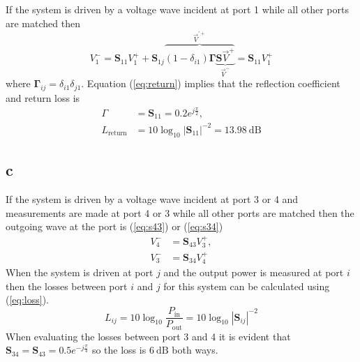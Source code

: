 \documentclass{article}
\begin{document}
If the system is driven by a voltage wave incident at port 1 while all other ports are matched then
\begin{equation}
  V^{-}_{1}=\mathbf{S}_{11}V^{+}_{1} + \mathbf{S}_{1j}\overbrace{(1-\delta_{i1})\mathbf{\Gamma}\underbrace{\mathbf{S}\vec{V}^{+}}_{\vec{V}^{-}}}^{\vec{V}^{'+}}=\mathbf{S}_{11}V^{+}_{1}
  \label{eq:return}
\end{equation}
where $\mathbf{\Gamma}_{ij}=\delta_{i1}\delta_{j1}$. Equation (\ref{eq:return}) implies that the reflection coefficient and return loss is
\begin{subequations}
  \begin{align}
    \Gamma & = \mathbf{S}_{11}=0.2e^{j\frac{\pi}{2}}, \\
    L_\text{return} & = 10\log_{10}|\mathbf{S}_{11}|^{-2}=\SI{13.98}{\deci\bel}
  \end{align}
  \label{eq:RL}
\end{subequations}

\subsection{c}\label{sec:1c}
If the system is driven by a voltage wave incident at port 3 or 4 and measurements are made at port 4 or 3 while all other ports are matched then the outgoing wave at the port is (\ref{eq:s43}) or (\ref{eq:s34})
\begin{subequations}
  \begin{align}
    V^{-}_{4} & =\mathbf{S}_{43}V^{+}_{3}, \label{eq:s43} \\
    V^{-}_{3} & =\mathbf{S}_{34}V^{+}_{4} \label{eq:s34}
  \end{align}
\end{subequations}
When the system is driven at port $j$ and the output power is measured at port $i$ then the losses between port $i$ and $j$ for this system can be calculated using (\ref{eq:loss}).
\begin{equation}
  L_{ij}=10\log_{10}\frac{P_\text{in}}{P_\text{out}}=10\log_{10}|\mathbf{S}_{ij}|^{-2}
  \label{eq:loss}
\end{equation}
When evaluating the losses between port 3 and 4 it is evident that $\mathbf{S}_{34}=\mathbf{S}_{43}=0.5e^{-j\frac{\pi}{4}}$ so the loss is $\SI{6}{\deci\bel}$ both ways.
\end{document}
